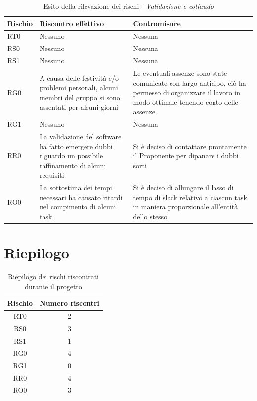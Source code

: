\documentclass[./PianodiProgetto.tex]{subfiles}
\begin{document}
\begin{longtable}{|p{15mm}|p{60mm}|p{60mm}|}
	\caption{Esito della rilevazione dei rischi - \textit{Validazione e collaudo}} \\
	\hline \textbf{Rischio} & \textbf{Riscontro effettivo} & \textbf{Contromisure} \\
	
	\hline RT0 & Nessuno & Nessuna \\
	
	\hline RS0 & Nessuno & Nessuna \\
	
	\hline RS1 & Nessuno & Nessuna \\
	
	\hline RG0 & A causa delle festività e/o problemi personali, alcuni membri del gruppo si sono assentati per alcuni giorni & Le eventuali assenze sono state comunicate con largo anticipo, ciò ha permesso di organizzare il lavoro in modo ottimale tenendo conto delle assenze \\
	
	\hline RG1 & Nessuno & Nessuna \\
	
	\hline RR0 & La validazione del software ha fatto emergere dubbi riguardo un possibile raffinamento di alcuni requisiti & Si è deciso di contattare prontamente il Proponente per dipanare i dubbi sorti \\
	
	\hline RO0 & La sottostima dei tempi necessari ha causato ritardi nel compimento di alcuni task & Si è deciso di allungare il lasso di tempo di slack relativo a ciascun task in maniera proporzionale all'entità dello stesso \\
	
	\hline
\end{longtable}

\newpage

\section{Riepilogo}

\setlength\LTleft{40mm}

\begin{longtable}{|c|c|}
	\caption{Riepilogo dei rischi riscontrati durante il progetto} \\
	\hline \textbf{Rischio} & \textbf{Numero riscontri} \\
	
	\hline RT0 & 2 \\
	
	\hline RS0 & 3 \\
	
	\hline RS1 & 1 \\
	
	\hline RG0 & 4 \\
	
	\hline RG1 & 0 \\
	
	\hline RR0 & 4 \\
	
	\hline RO0 & 3 \\
	
	\hline
\end{longtable}
\end{document}
